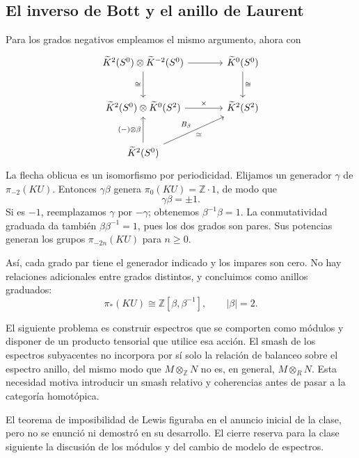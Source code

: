 \subsection{El inverso de Bott y el anillo de Laurent}
Para los grados negativos empleamos el mismo argumento, ahora con
\[
\begin{tikzcd}[column sep=large,row sep=large]
\widetilde K^2(S^0)\otimes\widetilde K^{-2}(S^0)\arrow[r]\arrow[d,"\cong"']&
\widetilde K^0(S^0)\arrow[d,"\cong"]\\
\widetilde K^2(S^0)\otimes\widetilde K^0(S^2)\arrow[r,"\times"]&\widetilde K^2(S^2)\\
\widetilde K^2(S^0)\arrow[u,"(-)\otimes\beta"]\arrow[ur,"B_\beta","\simeq"']&
\end{tikzcd}
\]
La flecha oblicua es un isomorfismo por periodicidad. Elijamos un generador $\gamma$ de $\pi_{-2}(KU)$. Entonces $\gamma\beta$ genera $\pi_0(KU)=\mathbb Z\cdot1$, de modo que
\[
\gamma\beta=\pm1.
\]
Si es $-1$, reemplazamos $\gamma$ por $-\gamma$; obtenemos $\beta^{-1}\beta=1$. La conmutatividad graduada da también $\beta\beta^{-1}=1$, pues los dos grados son pares. Sus potencias generan los grupos $\pi_{-2n}(KU)$ para $n\geq0$.

Así, cada grado par tiene el generador indicado y los impares son cero. No hay relaciones adicionales entre grados distintos, y concluimos como anillos graduados:
\[
\pi_*(KU)\cong\mathbb Z[\beta,\beta^{-1}],
\qquad |\beta|=2.
\]

El siguiente problema es construir espectros que se comporten como módulos y disponer de un producto tensorial que utilice esa acción. El smash de los espectros subyacentes no incorpora por sí solo la relación de balanceo sobre el espectro anillo, del mismo modo que $M\otimes_{\mathbb Z}N$ no es, en general, $M\otimes_RN$. Esta necesidad motiva introducir un smash relativo y coherencias antes de pasar a la categoría homotópica.

El teorema de imposibilidad de Lewis figuraba en el anuncio inicial de la clase, pero no se enunció ni demostró en su desarrollo. El cierre reserva para la clase siguiente la discusión de los módulos y del cambio de modelo de espectros.
